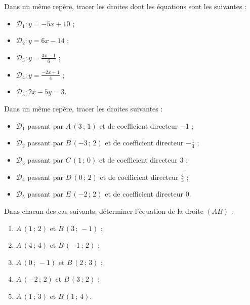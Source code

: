 \begin{exo}
Dans un même repère, tracer les droites dont les équations sont les suivantes :
\vspace{-1em}\begin{multicols}{3}\begin{itemize}
	\item $\mathcal{D}_1:y=-5x+10$ ;
	\item $\mathcal{D}_2:y=6x-14$ ;%
	\item $\mathcal{D}_3:y=\frac{3x-1}{6}$ ;%
	\item $\mathcal{D}_4:y=\frac{-2x+1}{4}$ ;%
	\item $\mathcal{D}_5:2x-5y=3$.
\end{itemize}\end{multicols}\vspace{-1em}
\end{exo}


\begin{exo}
Dans un même repère, tracer les droites suivantes :
\begin{itemize}
	\item $\mathcal{D}_1$ passant par $A\,(3\,;\,1)$ et de coefficient directeur $-1$ ;
	\item $\mathcal{D}_2$ passant par $B\,(-3\,;\,2)$ et de coefficient directeur $-\frac{1}{4}$ ;
	\item $\mathcal{D}_3$ passant par $C\,(1\,;\,0)$ et de coefficient directeur $3$ ;
	\item $\mathcal{D}_4$ passant par $D\,(0\,;\,2)$ et de coefficient directeur $\frac{4}{3}$ ;
	\item $\mathcal{D}_5$ passant par $E\,(-2\,;\,2)$ et de coefficient directeur $0$.
\end{itemize}%
\end{exo}


\begin{exo}
Dans chacun des cas suivants, déterminer l'équation de la droite $(AB)$ :
\vspace{-1em}\begin{multicols}{3}\begin{enumerate}
	\item $A\,(1\,;\,2)$ et $B\,(3\,;\,-1)$ ;
	\item $A\,(4\,;\,4)$ et $B\,(-1\,;\,2)$ ;
	\item $A\,(0\,;\,-1)$ et $B\,(2\,;\,3)$ ;
	\item $A\,(-2\,;\,2)$ et $B\,(3\,;\,2)$ ;
	\item $A\,(1\,;\,3)$ et $B\,(1\,;\,4)$.
\end{enumerate}\end{multicols}\vspace{-1em}
\end{exo}

